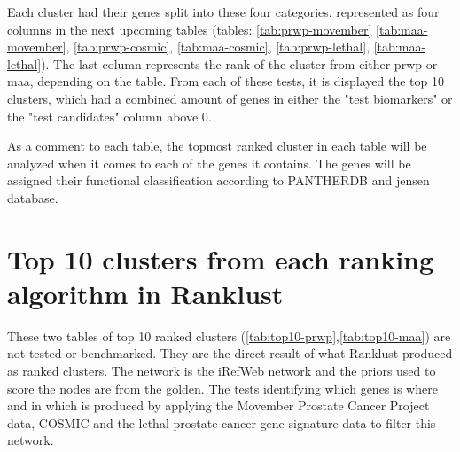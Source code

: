 Each cluster had their genes split into these four categories, represented as
four columns in the next upcoming tables (tables: \ref{tab:prwp-movember}
\ref{tab:maa-movember}, \ref{tab:prwp-cosmic}, \ref{tab:maa-cosmic},
\ref{tab:prwp-lethal}, \ref{tab:maa-lethal}). The last column represents the
rank of the cluster from either \gls{prwp} or \gls{maa}, depending on the table.
From each of these tests, it is displayed the top 10 clusters, which had
a combined amount of genes in either the "test biomarkers" or the "test
candidates" column above 0.

As a comment to each table, the topmost ranked cluster in each table will be
analyzed when it comes to each of the genes it contains. The genes will be
assigned their functional classification according to PANTHERDB and \gls{jensen}
database\cite{pantherdb,panther,disgenet}.

\section{Top 10 clusters from each ranking algorithm in Ranklust}
These two tables of top 10 ranked clusters
(\ref{tab:top10-prwp},\ref{tab:top10-maa}) are not tested or benchmarked. They
are the direct result of what Ranklust produced as ranked clusters. The network
is the iRefWeb network and the priors used to score the nodes are from the
\gls{golden}. The tests identifying which genes is where and in which is produced by
applying the Movember Prostate Cancer Project data, COSMIC and the lethal
prostate cancer gene signature data to filter this network.

